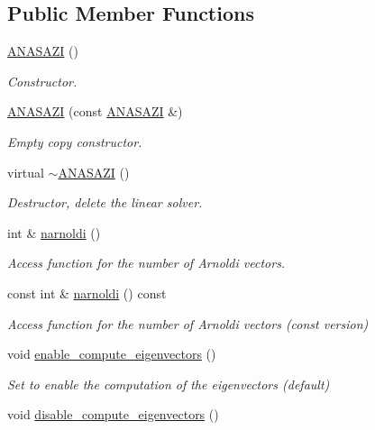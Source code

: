 \subsection*{Public Member Functions}
\begin{DoxyCompactItemize}
\item 
\hyperlink{classoomph_1_1ANASAZI_af90440448c3cbbb7c21bc6ce3bbb2d0a}{A\+N\+A\+S\+A\+ZI} ()
\begin{DoxyCompactList}\small\item\em Constructor. \end{DoxyCompactList}\item 
\hyperlink{classoomph_1_1ANASAZI_abfab863205ce697807b4a1ac5e74ac8f}{A\+N\+A\+S\+A\+ZI} (const \hyperlink{classoomph_1_1ANASAZI}{A\+N\+A\+S\+A\+ZI} \&)
\begin{DoxyCompactList}\small\item\em Empty copy constructor. \end{DoxyCompactList}\item 
virtual \hyperlink{classoomph_1_1ANASAZI_a3f7e7f7fdc23c04c419fba24474f95a7}{$\sim$\+A\+N\+A\+S\+A\+ZI} ()
\begin{DoxyCompactList}\small\item\em Destructor, delete the linear solver. \end{DoxyCompactList}\item 
int \& \hyperlink{classoomph_1_1ANASAZI_a525fd6b30a06a869c50983d6ccad0801}{narnoldi} ()
\begin{DoxyCompactList}\small\item\em Access function for the number of Arnoldi vectors. \end{DoxyCompactList}\item 
const int \& \hyperlink{classoomph_1_1ANASAZI_a5f0489a5b0cd830ba93e1ae33cc14c24}{narnoldi} () const
\begin{DoxyCompactList}\small\item\em Access function for the number of Arnoldi vectors (const version) \end{DoxyCompactList}\item 
void \hyperlink{classoomph_1_1ANASAZI_aa965449f7db8c881305665ba83d4b9b6}{enable\+\_\+compute\+\_\+eigenvectors} ()
\begin{DoxyCompactList}\small\item\em Set to enable the computation of the eigenvectors (default) \end{DoxyCompactList}\item 
void \hyperlink{classoomph_1_1ANASAZI_a7e2035b9291fdc43d9e514c2f97a2b95}{disable\+\_\+compute\+\_\+eigenvectors} ()

\end{DoxyCompactItemize}
